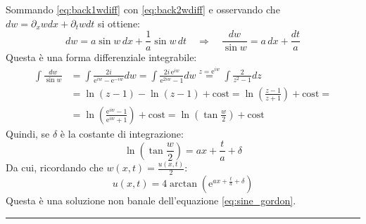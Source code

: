 \documentclass[]{scrartcl}
\newcommand{\qedsymbol}{\hfill \rule{0.7em}{0.7em}}
\newcommand{\px}{\partial_x}
\newcommand{\pt}{\partial_t}
\begin{document}
Sommando \eqref{eq:back1wdiff} con \eqref{eq:back2wdiff} e osservando che $ dw = \px w dx + \pt w dt $ si ottiene:
\[	dw = a\sin w\,dx + \frac{1}{a} \sin w\,dt \quad	\Rightarrow  \quad \frac{dw}{\sin w} = a\,dx + \frac{dt}{a}\]
Questa è una forma differenziale integrabile:
\[
\begin{split}
\int \frac{dw}{\sin w} & = \int \frac{2i}{\mathrm{e}^{iw}-\mathrm{e}^{-iw}}dw = \int \frac{2i\,\mathrm{e}^{iw}}{\mathrm{e}^{2iw}-1}dw \stackrel{z=\mathrm{e}^{iw}}{=} \int \frac{2}{z^2-1}dz \\ & = \ln\left(z-1\right) - \ln\left(z-1\right) + \mathrm{cost} = \ln\left( \frac{z-1}{z+1} \right) + \mathrm{cost} = \\ & = \ln\left( \frac{\mathrm{e}^{iw}-1}{\mathrm{e}^{iw}+1} \right) + \mathrm{cost} = \ln\left(\tan\frac{w}{2}\right)	+ \mathrm{cost}
\end{split}
\]
Quindi, se $ \delta $ è la costante di integrazione:
\[	\ln\left(\tan\frac{w}{2}\right) = ax + \frac{t}{a} + \delta 	\]
Da cui, ricordando che $ w(x,t) = \frac{u(x,t)}{2} $:
\[	u(x,t) = 4 \arctan\left(\mathrm{e}^{ax + \frac{t}{a} + \delta}\right)		\]
Questa è una soluzione non banale dell'equazione \eqref{eq:sine_gordon}. 
\qedsymbol
\end{document}

